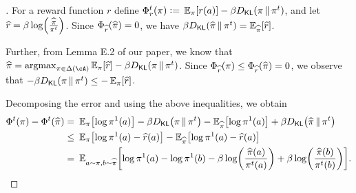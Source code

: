 \begin{proof}[]
    For a reward function $r$ define $\Phi_{r}\ind{t}(\pi) \ldef{} \En_\pi\sbr*{r(a)} - \beta\Dkl{\pi}{\pi\ind{t}}$, and let $\rhat = \beta\log\rbr*{\frac{\pihat}{\pi\ind{t}}}$.  
    Since $\Phi_{{\widehat r}}(\widehat{\pi}) = 0$, we have $\beta\Dkl{\pihat}{\pi\ind{t}} = \En_{\pihat}\sbr{\rhat}$. 
    
    Further, from Lemma E.2 of our paper, we know that $\pihat = \argmax_{\pi \in\Delta(\cA)} \En_\pi\sbr*{\rhat} - \beta\Dkl{\pi}{\pi\ind{t}}$. Since $\Phi_{{\widehat r}}(\pi) \le \Phi_{{\widehat r}}(\widehat{\pi}) = 0$, we observe that $-\beta\Dkl{\pi}{\pi\ind{t}} \le -\En_\pi\sbr{\rhat}$. 

    Decomposing the error and using the above inequalities, we obtain 
    \begin{align*}
        \Phi\ind{t}(\pi) - \Phi\ind{t}(\pihat)
        =&~ 
        \En_\pi\sbr*{\log\pi\ind{1}(a)} - \beta\Dkl{\pi}{\pi\ind{t}} - \En_{\pihat}\sbr*{\log\pi\ind{1}(a)} + \beta \Dkl{\pihat}{\pi\ind{t}}
        \\
        \le&~ 
        \En_\pi\sbr*{\log\pi\ind{1}(a) - \rhat(a)} - \En_{\pihat}\sbr*{\log\pi\ind{1}(a) - \rhat(a)}
        \\
        =&~ 
        \En_{a\sim\pi,b\sim\pihat}\sbr*{\log\pi\ind{1}(a) - \log\pi\ind{1}(b) - \beta\log\rbr*{\frac{\pihat(a)}{\pi\ind{t}(a)}} + \beta\log\rbr*{\frac{\pihat(b)}{\pi\ind{t}(b)}}}.  
    \end{align*}  



    
\end{proof}